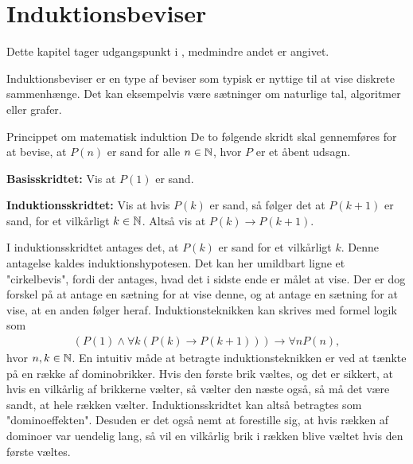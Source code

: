 \chapter{Induktionsbeviser}

Dette kapitel tager udgangspunkt i \citep{dmat}, medmindre andet er angivet.

Induktionsbeviser er en type af beviser som typisk er nyttige til at vise diskrete sammenhænge.
Det kan eksempelvis være sætninger om naturlige tal, algoritmer eller grafer.

\begin{theorembox}{Princippet om matematisk induktion}
	De to følgende skridt skal gennemføres for at bevise, at $P(n)$ er sand for alle $n \in \mathbb{N}$, hvor $P$ er et åbent udsagn.

	\textbf{Basisskridtet:} \quad 
	Vis at $P(1)$ er sand.
	
	\textbf{Induktionsskridtet:} \quad 
	Vis at hvis $P(k)$ er sand, så følger det at $P(k + 1)$ er sand, for et vilkårligt $k \in \mathbb{N}$.
	Altså vis at $P \left( k \right) \to P \left( k + 1 \right)$.
\end{theorembox}

I induktionsskridtet antages det, at $P(k)$ er sand for et vilkårligt $k$.
Denne antagelse kaldes induktionshypotesen.
Det kan her umildbart ligne et "cirkelbevis", fordi der antages, hvad det i sidste ende er målet at vise.
Der er dog forskel på at antage en sætning for at vise denne, og at antage en sætning for at vise, at en anden følger heraf.
Induktionsteknikken kan skrives med formel logik som
\begin{align*}
	(P(1) \land \forall k ( P(k) \to P(k + 1))) \to \forall n P(n),
\end{align*}
hvor $n, k \in \mathbb{N}$. En intuitiv måde at betragte induktionsteknikken er ved at tænkte på en række af dominobrikker.
Hvis den første brik væltes, og det er sikkert, at hvis en vilkårlig af brikkerne vælter, så vælter den næste også, så må det være sandt, at hele rækken vælter.
Induktionsskridtet kan altså betragtes som "dominoeffekten".
Desuden er det også nemt at forestille sig, at hvis rækken af dominoer var uendelig lang, så vil en vilkårlig brik i rækken blive væltet hvis den første væltes. 

